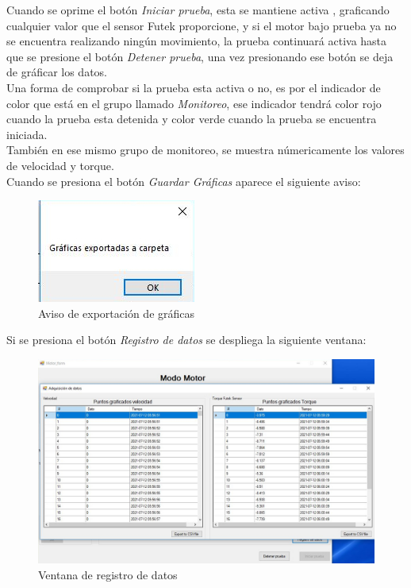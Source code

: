 \documentclass[12pt,titlepage]{article}
\begin{document}
Cuando se oprime el botón \textit{Iniciar prueba}, esta se mantiene activa , graficando cualquier valor que el sensor Futek proporcione, y si el motor bajo prueba ya no se encuentra realizando ningún movimiento, la prueba continuará activa hasta que se presione el botón \textit{Detener prueba}, una vez presionando ese botón se deja de gráficar los datos.\\

Una forma de comprobar si la prueba esta activa o no, es por el indicador de color que está en el grupo llamado \textit{Monitoreo}, ese indicador tendrá color rojo cuando la prueba esta detenida y color verde cuando la prueba se encuentra iniciada. \\

También en ese mismo grupo de monitoreo, se muestra númericamente los valores de velocidad y torque. \\ 
 
\newpage
Cuando se presiona el botón \textit{Guardar Gráficas} aparece el siguiente aviso: \\ 
\begin{figure}[htbp]
\hspace*{6.8cm} 
\includegraphics[scale=0.65]{graphs}
\caption{Aviso de exportación de gráficas}
\end{figure}

Si se presiona el botón \textit{Registro de datos} se despliega la siguiente ventana: \\ 

\begin{figure}[htbp]
\hspace*{0.1cm} 
\includegraphics[scale=0.57]{datos}
\caption{Ventana de registro de datos}
\end{figure}
\end{document}
